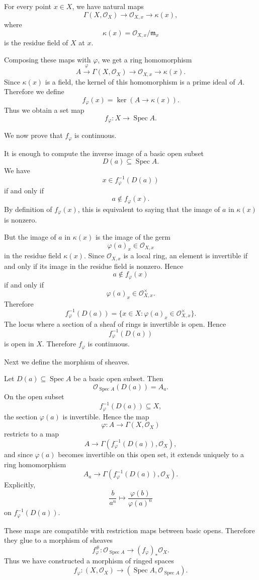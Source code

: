 \documentclass[12pt,a4paper]{article}
\newcommand{\Spec}{\operatorname{Spec}}
\theoremstyle{notespace}
\begin{document}
For every point \(x\in X\), we have natural maps
\[
\Gamma(X,\mathcal O_X)
\longrightarrow
\mathcal O_{X,x}
\longrightarrow
\kappa(x),
\]
where
\[
\kappa(x)=\mathcal O_{X,x}/\mathfrak m_x
\]
is the residue field of \(X\) at \(x\).

Composing these maps with \(\varphi\), we get a ring homomorphism
\[
A
\xrightarrow{\varphi}
\Gamma(X,\mathcal O_X)
\longrightarrow
\mathcal O_{X,x}
\longrightarrow
\kappa(x).
\]
Since \(\kappa(x)\) is a field, the kernel of this homomorphism is a prime ideal of \(A\). Therefore we define
\[
f_\varphi(x)
=
\ker\left(A\to \kappa(x)\right).
\]
Thus we obtain a set map
\[
f_\varphi:X\to \Spec A.
\]

We now prove that \(f_\varphi\) is continuous.

It is enough to compute the inverse image of a basic open subset
\[
D(a)\subseteq \Spec A.
\]
We have
\[
x\in f_\varphi^{-1}(D(a))
\]
if and only if
\[
a\notin f_\varphi(x).
\]
By definition of \(f_\varphi(x)\), this is equivalent to saying that the image of \(a\) in \(\kappa(x)\) is nonzero.

But the image of \(a\) in \(\kappa(x)\) is the image of the germ
\[
\varphi(a)_x\in \mathcal O_{X,x}
\]
in the residue field \(\kappa(x)\). Since \(\mathcal O_{X,x}\) is a local ring, an element is invertible if and only if its image in the residue field is nonzero. Hence
\[
a\notin f_\varphi(x)
\]
if and only if
\[
\varphi(a)_x\in \mathcal O_{X,x}^{\times}.
\]
Therefore
\[
f_\varphi^{-1}(D(a))
=
\{x\in X:\varphi(a)_x\in \mathcal O_{X,x}^{\times}\}.
\]
The locus where a section of a sheaf of rings is invertible is open. Hence
\[
f_\varphi^{-1}(D(a))
\]
is open in \(X\). Therefore \(f_\varphi\) is continuous.

Next we define the morphism of sheaves.

Let \(D(a)\subseteq \Spec A\) be a basic open subset. Then
\[
\mathcal O_{\Spec A}(D(a))=A_a.
\]
On the open subset
\[
f_\varphi^{-1}(D(a))\subseteq X,
\]
the section \(\varphi(a)\) is invertible. Hence the map
\[
\varphi:A\to \Gamma(X,\mathcal O_X)
\]
restricts to a map
\[
A\to \Gamma(f_\varphi^{-1}(D(a)),\mathcal O_X),
\]
and since \(\varphi(a)\) becomes invertible on this open set, it extends uniquely to a ring homomorphism
\[
A_a
\longrightarrow
\Gamma(f_\varphi^{-1}(D(a)),\mathcal O_X).
\]
Explicitly,
\[
\frac b{a^n}
\longmapsto
\frac{\varphi(b)}{\varphi(a)^n}
\]
on \(f_\varphi^{-1}(D(a))\).

These maps are compatible with restriction maps between basic opens. Therefore they glue to a morphism of sheaves
\[
f_\varphi^\#:\mathcal O_{\Spec A}\to (f_\varphi)_*\mathcal O_X.
\]
Thus we have constructed a morphism of ringed spaces
\[
f_\varphi:(X,\mathcal O_X)\to (\Spec A,\mathcal O_{\Spec A}).
\]
\end{document}
